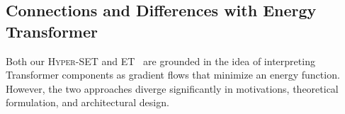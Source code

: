 \subsection{Connections and Differences with Energy Transformer}

Both our \textsc{Hyper-SET} and \textsc{ET}~\citep{hoover2024energy} are grounded in the idea of interpreting Transformer components as gradient flows that minimize an energy function. However, the two approaches diverge significantly in motivations, theoretical formulation, and architectural design.

